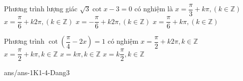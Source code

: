 \begin{ex}%
	Phương trình lượng giác $\sqrt{3}\cot x-3=0$ có nghiệm là
	\choice
	{$x=\dfrac{\pi}{3}+k\pi,\left(k\in \mathbb{Z}\right)$}
	{$x=\dfrac{\pi}{6}+k2\pi,\left(k\in \mathbb{Z}\right)$}
	{$x=-\dfrac{\pi}{6}+k2\pi,\left(k\in \mathbb{Z}\right)$}
	{\True $x=\dfrac{\pi}{6}+k\pi,\left(k\in \mathbb{Z}\right)$}
\end{ex}
\begin{ex}%
	Phương trình $\cot \left(\dfrac{\pi}{4}-2x\right)=1$ có nghiệm
	\choice
	{$x=\dfrac{\pi}{2}+k2\pi,k\in \mathbb{Z}$}
	{$x=\dfrac{\pi}{2}+k\pi,k\in \mathbb{Z}$}
	{$x=k\pi,k\in \mathbb{Z}$}
	{\True $x=k\dfrac{\pi}{2},k\in \mathbb{Z}$}
\end{ex}

\begin{indapan}{10}
	{ans/ans-1K1-4-Dang3}
\end{indapan}